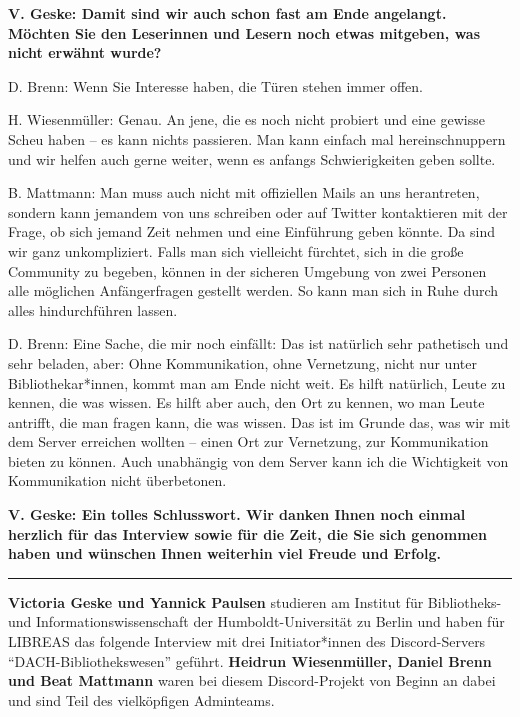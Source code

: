 \documentclass[a4paper,
fontsize=11pt,
oneside,
numbers=noperiodatend,
parskip=half-,
bibliography=totoc,
final
]{scrartcl}
\begin{document}
\textbf{V. Geske: Damit sind wir auch schon fast am Ende angelangt.
Möchten Sie den Leserinnen und Lesern noch etwas mitgeben, was nicht
erwähnt wurde?}

D. Brenn: Wenn Sie Interesse haben, die Türen stehen immer offen.

H. Wiesenmüller: Genau. An jene, die es noch nicht probiert und eine
gewisse Scheu haben -- es kann nichts passieren. Man kann einfach mal
hereinschnuppern und wir helfen auch gerne weiter, wenn es anfangs
Schwierigkeiten geben sollte.

B. Mattmann: Man muss auch nicht mit offiziellen Mails an uns
herantreten, sondern kann jemandem von uns schreiben oder auf Twitter
kontaktieren mit der Frage, ob sich jemand Zeit nehmen und eine
Einführung geben könnte. Da sind wir ganz unkompliziert. Falls man sich
vielleicht fürchtet, sich in die große Community zu begeben, können in
der sicheren Umgebung von zwei Personen alle möglichen Anfängerfragen
gestellt werden. So kann man sich in Ruhe durch alles hindurchführen
lassen.

D. Brenn: Eine Sache, die mir noch einfällt: Das ist natürlich sehr
pathetisch und sehr beladen, aber: Ohne Kommunikation, ohne Vernetzung,
nicht nur unter Bibliothekar*innen, kommt man am Ende nicht weit. Es
hilft natürlich, Leute zu kennen, die was wissen. Es hilft aber auch,
den Ort zu kennen, wo man Leute antrifft, die man fragen kann, die was
wissen. Das ist im Grunde das, was wir mit dem Server erreichen wollten
-- einen Ort zur Vernetzung, zur Kommunikation bieten zu können. Auch
unabhängig von dem Server kann ich die Wichtigkeit von Kommunikation
nicht überbetonen.

\textbf{V. Geske: Ein tolles Schlusswort. Wir danken Ihnen noch einmal
herzlich für das Interview sowie für die Zeit, die Sie sich genommen
haben und wünschen Ihnen weiterhin viel Freude und Erfolg.}

\begin{center}\rule{0.5\linewidth}{0.5pt}\end{center}

\textbf{Victoria Geske und Yannick Paulsen}  studieren am
Institut für Bibliotheks- und Informationswissenschaft der
Humboldt-Universität zu Berlin und haben für LIBREAS das folgende
Interview mit drei Initiator*innen des Discord-Servers
``DACH-Bibliothekswesen'' geführt. \textbf{Heidrun Wiesenmüller, Daniel Brenn
und Beat Mattmann} waren bei diesem Discord-Projekt von Beginn an dabei
und sind Teil des vielköpfigen Adminteams.
\end{document}
